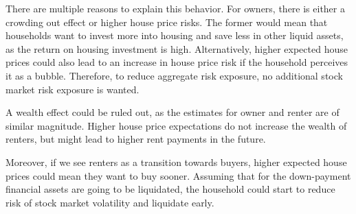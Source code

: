 \documentclass[ProjectABM]{subfiles}
\begin{document}



There are multiple reasons to explain this behavior. For owners, there is either a crowding out effect or higher house price risks. The former would mean that households want to invest more into housing and save less in other liquid assets, as the return on housing investment is high. Alternatively, higher expected house prices could also lead to an increase in house price risk if the household perceives it as a bubble. Therefore, to reduce aggregate risk exposure, no additional stock market risk exposure is wanted.

A wealth effect could be ruled out, as the estimates for owner and renter are of similar magnitude. Higher house price expectations do not increase the wealth of renters, but might lead to higher rent payments in the future. 

Moreover, if we see renters as a transition towards buyers, higher expected house prices could mean they want to buy sooner. Assuming that for the down-payment financial assets are going to be liquidated, the household could start to reduce risk of stock market volatility and liquidate early.


\end{document}

